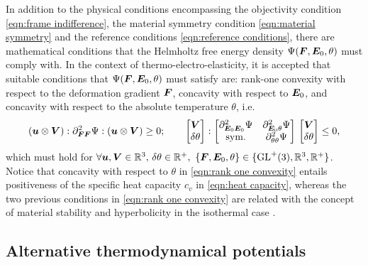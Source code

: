 In addition to the physical conditions encompassing the objectivity condition \eqref{eqn:frame indifference}, the material symmetry condition \eqref{eqn:material symmetry} and the reference conditions \eqref{eqn:reference conditions}, there are mathematical conditions that the Helmholtz free energy density $\Psi(\boldsymbol{F},\boldsymbol{E}_0,\theta)$ must comply with. In the context of thermo-electro-elasticity, it is accepted that  suitable conditions that $\Psi(\boldsymbol{F},\boldsymbol{E}_0,\theta)$ must satisfy are: rank-one convexity with respect to the deformation gradient $\boldsymbol{F}$, concavity with respect to $\boldsymbol{E}_0$, and concavity with respect to the absolute temperature $\theta$, i.e.
%
\begin{equation}\label{eqn:rank one convexity}
\left(\vect{u}\otimes\vect{V}\right):\partial^2_{\vect{F}\vect{F}}\Psi:\left(\vect{u}\otimes\vect{V}\right)\geq 0;\qquad
%
%
%
\begin{bmatrix}
\vect{V}\\
\delta\theta 
\end{bmatrix}: \begin{bmatrix}
\partial^2_{\vect{E}_0\vect{E}_0}\Psi  &  \partial^2_{\vect{E}_0\theta}\Psi\\
%
\text{sym.}  &  \partial^2_{\theta\theta}\Psi
\end{bmatrix}\, \begin{bmatrix}
\vect{V}\\
\delta\theta 
\end{bmatrix}\leq 0,
%
\end{equation}
%
which must hold for $\forall \boldsymbol{u},\boldsymbol{V}\in \mathbb{R}^{3},\,\delta\theta\in\mathbb{R}^{+}, \,\,\{\boldsymbol{F},\boldsymbol{E}_0,\theta\}\in\{\text{GL}^{+}(3),\mathbb{R}^3,\mathbb{R}^{+}\}$. Notice that concavity with respect to $\theta$ in \eqref{eqn:rank one convexity} entails positiveness of the specific heat capacity $c_v$ in \eqref{eqn:heat capacity}, whereas the two previous conditions in \eqref{eqn:rank one convexity} are related with the concept of material stability and hyperbolicity in the isothermal case \cite{XX}.


\subsection{Alternative thermodynamical potentials}\label{sec:alternative potentials}

